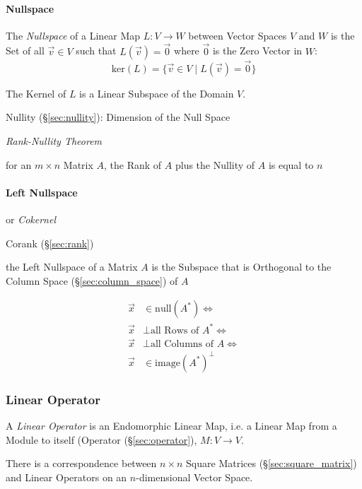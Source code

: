 \paragraph{Nullspace}\label{sec:nullspace}\hfill

The \emph{Nullspace} of a Linear Map $L : V \rightarrow W$ between Vector
Spaces $V$ and $W$ is the Set of all $\vec{v}\in{V}$ such that $L(\vec{v}) =
\vec{0}$ where $\vec{0}$ is the Zero Vector in $W$:
\[
  \text{ker}(L) = \{\vec{v}\in{V} \;|\; L(\vec{v}) = \vec{0}\}
\]

The Kernel of $L$ is a Linear Subspace of the Domain $V$.

Nullity (\S\ref{sec:nullity}): Dimension of the Null Space

\emph{Rank-Nullity Theorem}

for an $m \times n$ Matrix $A$, the Rank of $A$ plus the Nullity
of $A$ is equal to $n$



\paragraph{Left Nullspace}\label{sec:left_nullspace}\hfill

or \emph{Cokernel}

Corank (\S\ref{sec:rank})

the Left Nullspace of a Matrix $A$ is the Subspace that is Orthogonal to the
Column Space (\S\ref{sec:column_space}) of $A$

\begin{align*}
  \vec{x} & \in \mathrm{null}(A^*) \Leftrightarrow         \\
  \vec{x} & \bot \text{all Rows of }A^* \Leftrightarrow    \\
  \vec{x} & \bot \text{all Columns of }A \Leftrightarrow   \\
  \vec{x} & \in \mathrm{image}(A^*)^\bot
\end{align*}



\subsubsection{Linear Operator}\label{sec:linear_operator}

A \emph{Linear Operator} is an Endomorphic Linear Map, i.e. a Linear Map from a
Module to itself (Operator (\S\ref{sec:operator}), $M : V \rightarrow V$.

There is a correspondence between $n\times{n}$ Square Matrices
(\S\ref{sec:square_matrix}) and Linear Operators on an $n$-dimensional Vector
Space.

